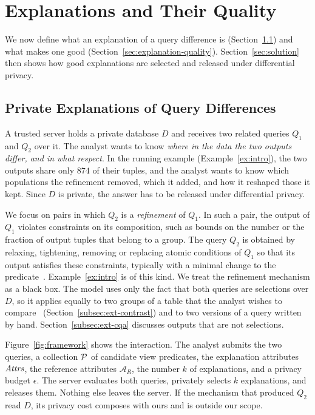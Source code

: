 
\section{Explanations and Their Quality}\label{sec:model}

We now define what an explanation of a query difference is (Section~\ref{subsec:private-query-difference-setting}) and what makes one good (Section~\ref{sec:explanation-quality}).
Section~\ref{sec:solution} then shows how good explanations are selected and released under differential privacy.

\subsection{Private Explanations of Query Differences}
\label{subsec:private-query-difference-setting}

A trusted server holds a private database $D$ and receives two related queries $Q_1$ and $Q_2$ over it.
The analyst wants to know \emph{where in the data the two outputs differ, and in what respect}.
In the running example (Example~\ref{ex:intro}), the two outputs share only $874$ of their tuples, and the analyst wants to know which populations the refinement removed, which it added, and how it reshaped those it kept.
Since $D$ is private, the answer has to be released under differential privacy.

We focus on pairs in which $Q_2$ is a \emph{refinement} of $Q_1$.
In such a pair, the output of $Q_1$ violates constraints on its composition, such as bounds on the number or the fraction of output tuples that belong to a group.
The query $Q_2$ is obtained by relaxing, tightening, removing or replacing atomic conditions of $Q_1$ so that its output satisfies these constraints, typically with a minimal change to the predicate~\cite{MK09,LMSJ23,ERICA,CSSM24}.
Example~\ref{ex:intro} is of this kind.
We treat the refinement mechanism as a black box.
The model uses only the fact that both queries are selections over $D$, so it applies equally to two groups of a table that the analyst wishes to compare~\cite{BayPazzani01,TaoGMR22} (Section~\ref{subsec:ext-contrast}) and to two versions of a query written by hand.
Section~\ref{subsec:ext-cqa} discusses outputs that are not selections.

Figure~\ref{fig:framework} shows the interaction.
The analyst submits the two queries, a collection $\mathcal{P}$ of candidate view predicates, the explanation attributes $\mathit{Attrs}$, the reference attributes $\mathcal{A}_R$, the number $k$ of explanations, and a privacy budget $\epsilon$.
The server evaluates both queries, privately selects $k$ explanations, and releases them.
Nothing else leaves the server.
If the mechanism that produced $Q_2$ read $D$, its privacy cost composes with ours and is outside our scope.

